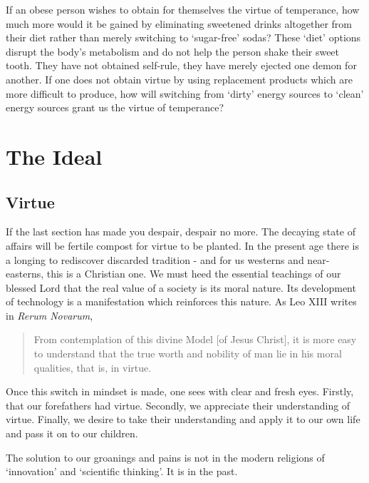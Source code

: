 \documentclass[letterpaper]{article}
\begin{document}
If an obese person wishes to obtain for themselves the virtue of temperance, how much more would it be gained by eliminating sweetened drinks altogether from their diet rather than merely switching to `sugar-free' sodas? These `diet' options disrupt the body's metabolism and do not help the person shake their sweet tooth. They have not obtained self-rule, they have merely ejected one demon for another. If one does not obtain virtue by using replacement products which are more difficult to produce, how will switching from `dirty' energy sources to `clean' energy sources grant us the virtue of temperance?

\section{The Ideal}


\subsection{Virtue}

If the last section has made you despair, despair no more. The decaying state of affairs will be fertile compost for virtue to be planted. In the present age there is a longing to rediscover discarded tradition - and for us westerns and near-easterns, this is a Christian one. We must heed the essential teachings of our blessed Lord that the real value of a society is its moral nature. Its development of technology is a manifestation which reinforces this nature. As Leo XIII writes in \textit{Rerum Novarum},

\begin{quote}
  From contemplation of this divine Model [of Jesus Christ], it is more easy to understand that the true worth and nobility of man lie in his moral qualities, that is, in virtue.
\end{quote}

Once this switch in mindset is made, one sees with clear and fresh eyes. Firstly, that our forefathers had virtue. Secondly, we appreciate their understanding of virtue. Finally, we desire to take their understanding and apply it to our own life and pass it on to our children.

The solution to our groanings and pains is not in the modern religions of `innovation' and `scientific thinking'. It is in the past.
\end{document}
